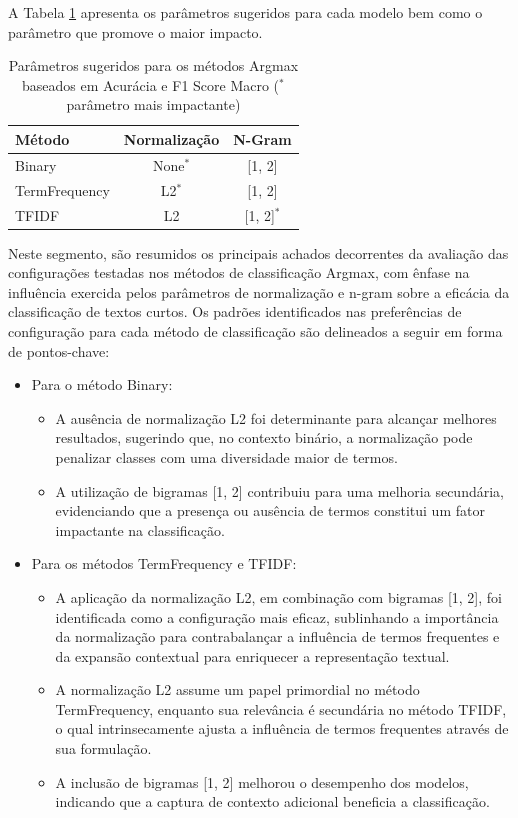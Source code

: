 A Tabela \ref{tab:resumo_parametros} apresenta os parâmetros sugeridos para cada modelo bem como o parâmetro que promove o maior impacto.

\begin{table}[H]
\centering
\caption{Parâmetros sugeridos para os métodos Argmax baseados em Acurácia e F1 Score Macro ($^*$ parâmetro mais impactante)}
\label{tab:resumo_parametros}
\begin{tabular}{lcc}
\hline
\textbf{Método} & \textbf{Normalização} & \textbf{N-Gram} \\
\hline
Binary & None$^*$ & [1, 2] \\
TermFrequency & L2$^*$ & [1, 2] \\
TFIDF & L2 & [1, 2]$^*$ \\
\hline
\end{tabular}
\end{table}

Neste segmento, são resumidos os principais achados decorrentes da avaliação das configurações testadas nos métodos de classificação Argmax, com ênfase na influência exercida pelos parâmetros de normalização e n-gram sobre a eficácia da classificação de textos curtos. Os padrões identificados nas preferências de configuração para cada método de classificação são delineados a seguir em forma de pontos-chave:

\begin{itemize}
    \item Para o método Binary:
    \begin{itemize}
        \item A ausência de normalização L2 foi determinante para alcançar melhores resultados, sugerindo que, no contexto binário, a normalização pode penalizar classes com uma diversidade maior de termos.
        \item A utilização de bigramas [1, 2] contribuiu para uma melhoria secundária, evidenciando que a presença ou ausência de termos constitui um fator impactante na classificação.
    \end{itemize}
    \item Para os métodos TermFrequency e TFIDF:
    \begin{itemize}
        \item A aplicação da normalização L2, em combinação com bigramas [1, 2], foi identificada como a configuração mais eficaz, sublinhando a importância da normalização para contrabalançar a influência de termos frequentes e da expansão contextual para enriquecer a representação textual.
        \item A normalização L2 assume um papel primordial no método TermFrequency, enquanto sua relevância é secundária no método TFIDF, o qual intrinsecamente ajusta a influência de termos frequentes através de sua formulação.
        \item A inclusão de bigramas [1, 2] melhorou o desempenho dos modelos, indicando que a captura de contexto adicional beneficia a classificação.
    \end{itemize}
\end{itemize}




